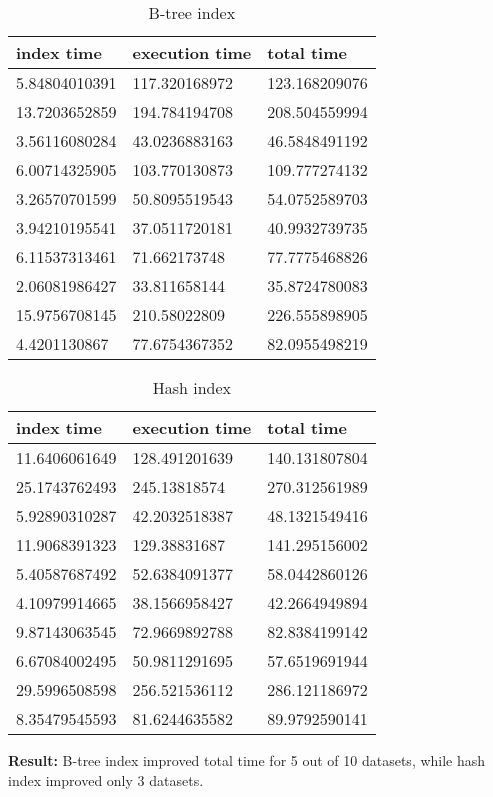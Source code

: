 \begin{itemize*}
\begin{table}[H]
\begin{center}
\begin{tabular}{|l|l|l|}
\hline
index time & execution time & total time                \\ \hline
5.84804010391 & 117.320168972 & 123.168209076 \\ \hline
13.7203652859 & 194.784194708 & 208.504559994 \\ \hline
3.56116080284 & 43.0236883163 & 46.5848491192 \\ \hline
6.00714325905 & 103.770130873 & 109.777274132 \\ \hline
3.26570701599 & 50.8095519543 & 54.0752589703 \\ \hline
3.94210195541 & 37.0511720181 & 40.9932739735 \\ \hline
6.11537313461 & 71.662173748 & 77.7775468826 \\ \hline
2.06081986427 & 33.811658144 & 35.8724780083 \\ \hline
15.9756708145 & 210.58022809 & 226.555898905 \\ \hline
4.4201130867 & 77.6754367352 & 82.0955498219 \\ \hline
\end{tabular}
\end{center}
\caption{B-tree index}
\end{table}

\begin{table}[H]
\begin{center}
\begin{tabular}{|l|l|l|}
\hline
index time & execution time & total time     \\ \hline
11.6406061649 & 128.491201639 & 140.131807804 \\ \hline
25.1743762493 & 245.13818574 & 270.312561989 \\ \hline
5.92890310287 & 42.2032518387 & 48.1321549416 \\ \hline
11.9068391323 & 129.38831687 & 141.295156002 \\ \hline
5.40587687492 & 52.6384091377 & 58.0442860126 \\ \hline
4.10979914665 & 38.1566958427 & 42.2664949894 \\ \hline
9.87143063545 & 72.9669892788 & 82.8384199142 \\ \hline
6.67084002495 & 50.9811291695 & 57.6519691944 \\ \hline
29.5996508598 & 256.521536112 & 286.121186972 \\ \hline
8.35479545593 & 81.6244635582 & 89.9792590141 \\ \hline
\end{tabular}
\end{center}
\caption{Hash index}
\end{table}

\par \textbf{Result:} B-tree index improved total time for 5 out of 10 datasets, while hash index improved only 3 datasets.
\end{itemize*}
